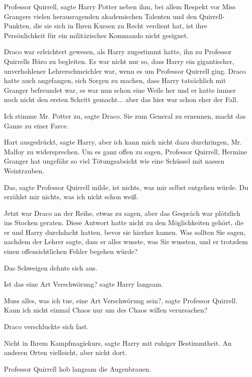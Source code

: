 \glqq{}Professor Quirrell\grqq{}, sagte Harry Potter neben ihm, \glqq{}bei allem
Respekt vor Miss Grangers vielen herausragenden akademischen Talenten und den
Quirrell-Punkten, die sie sich in Ihren Kursen zu Recht verdient hat, ist ihre
Persönlichkeit für ein militärisches Kommando nicht geeignet.\grqq{}

Draco war erleichtert gewesen, als Harry zugestimmt hatte, ihn zu Professor
Quirrells Büro zu begleiten. Es war nicht nur so, dass Harry ein gigantischer,
unverhohlener Lehrerschmeichler war, wenn es um Professor Quirrell ging. Draco
hatte auch angefangen, sich Sorgen zu machen, dass Harry tatsächlich mit Granger
befreundet war, es war nun schon eine Weile her und er hatte immer noch nicht
den ersten Schritt gemacht... aber das hier war schon eher der Fall.

\glqq{}Ich stimme Mr. Potter zu\grqq{}, sagte Draco. \glqq{}Sie zum General zu
ernennen, macht das Ganze zu einer Farce.\grqq{}

\glqq{}Hart ausgedrückt\grqq{}, sagte Harry, \glqq{}aber ich kann mich nicht
dazu durchringen, Mr. Malfoy zu widersprechen. Um es ganz offen zu sagen,
Professor Quirrell, Hermine Granger hat ungefähr so viel Tötungsabsicht wie eine
Schüssel mit nassen Weintrauben.\grqq{}

\glqq{}Das\grqq{}, sagte Professor Quirrell milde, \glqq{}ist nichts, was mir
selbst entgehen würde. Du erzählst mir nichts, was ich nicht schon weiß.\grqq{}

Jetzt war Draco an der Reihe, etwas zu sagen, aber das Gespräch war plötzlich
ins Stocken geraten. Diese Antwort hatte nicht zu den Möglichkeiten gehört, die
er und Harry durchdacht hatten, bevor sie hierher kamen. Was sollten Sie sagen,
nachdem der Lehrer sagte, dass er alles wusste, was Sie wussten, und er trotzdem
einen offensichtlichen Fehler begehen würde?

Das Schweigen dehnte sich aus.

\glqq{}Ist das eine Art Verschwörung?\grqq{} sagte Harry langsam.

\glqq{}Muss alles, was ich tue, eine Art Verschwörung sein?\grqq{}, sagte
Professor Quirrell. \glqq{}Kann ich nicht einmal Chaos nur um des Chaos willen
verursachen?\grqq{}

Draco verschluckte sich fast.

\glqq{}Nicht in Ihrem Kampfmagiekurs\grqq{}, sagte Harry mit ruhiger
Bestimmtheit. \glqq{}An anderen Orten vielleicht, aber nicht dort.\grqq{}

Professor Quirrell hob langsam die Augenbrauen.


